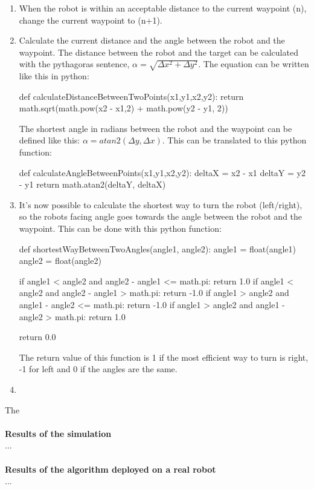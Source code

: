 \documentclass[10pt]{report}
\begin{document}
\begin{enumerate}
    \item When the robot is within an acceptable distance to the current waypoint (n), change the current waypoint to (n+1).
    \item Calculate the current distance and the angle between the robot and the waypoint. The distance between the robot and the target can be calculated with the pythagoras sentence, $\alpha = \sqrt{\Delta x^{2} + \Delta y^{2}}$.
    The equation can be written like this in python: 
    \begin{python}
def calculateDistanceBetweenTwoPoints(x1,y1,x2,y2):
    return math.sqrt(math.pow(x2 - x1,2) + math.pow(y2 - y1, 2))
    \end{python}
    The shortest angle in radians between the robot and the waypoint can be defined like this: $\alpha = atan2(\Delta y, \Delta x)$.
    This can be translated to this python function:
    \begin{python}
def calculateAngleBetweenPoints(x1,y1,x2,y2):
    deltaX = x2 - x1
    deltaY = y2 - y1
    return math.atan2(deltaY, deltaX)
    \end{python}    
    \item It's now possible to calculate the shortest way to turn the robot (left/right), so the robots facing angle goes towards the angle between the robot and the waypoint. This can be done with this python function: \begin{python}
def shortestWayBetweenTwoAngles(angle1, angle2): 
    angle1 = float(angle1)
    angle2 = float(angle2)

    if angle1 < angle2 and angle2 - angle1 <= math.pi:
        return 1.0
    if angle1 < angle2 and angle2 - angle1 > math.pi:
        return -1.0
    if angle1 > angle2 and angle1 - angle2 <= math.pi:
        return -1.0
    if angle1 > angle2 and angle1 - angle2 > math.pi:
        return 1.0

    return 0.0
    \end{python} The return value of this function is 1 if the most efficient way to turn is right, -1 for left and 0 if the angles are the same. 
    \item 
\end{enumerate}
The
\\\\
\textbf{Results of the simulation} \\
...
\\\\
\textbf{Results of the algorithm deployed on a real robot} \\
...
\end{document}
